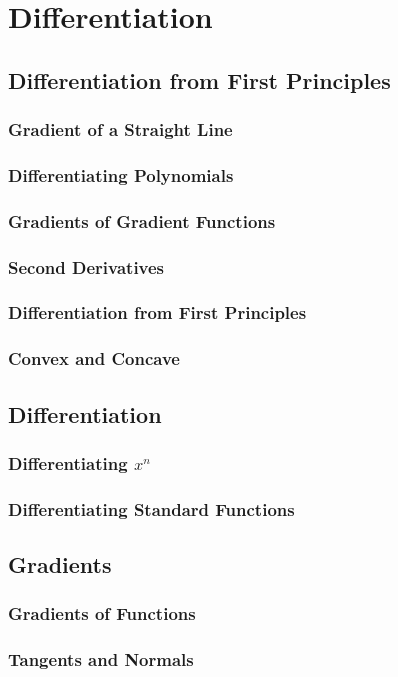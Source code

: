\documentclass[../maths.tex]{subfiles}
\begin{document}
\chapter{Differentiation}
\section{Differentiation from First Principles}
\subsection*{Gradient of a Straight Line}
\subsection*{Differentiating Polynomials}
\subsection*{Gradients of Gradient Functions}
\subsection*{Second Derivatives}
\subsection*{Differentiation from First Principles}
\subsection*{Convex and Concave}
\section{Differentiation}
\subsection*{Differentiating \texorpdfstring{$x^n$}{x to the n}}
\subsection*{Differentiating Standard Functions}
\section{Gradients}
\subsection*{Gradients of Functions}
\subsection*{Tangents and Normals}
\end{document}
